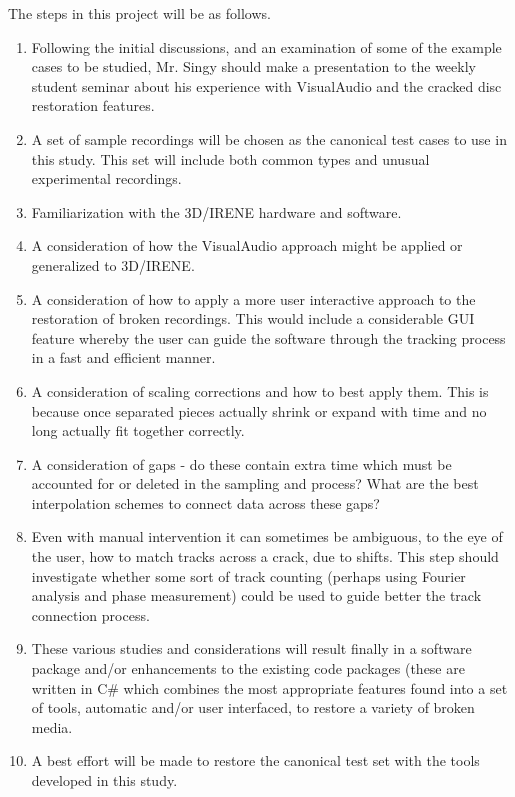 The steps in this project will be as follows.

\begin{enumerate}
\item Following the initial discussions, and an examination of some of the example cases to be studied, Mr. Singy should make a presentation to the weekly student seminar about his experience with VisualAudio and the cracked disc restoration features.
\item A set of sample recordings will be chosen as the canonical test cases to use in this study. This set will include both common types and unusual experimental recordings.
\item Familiarization with the 3D/IRENE hardware and software.
\item A consideration of how the VisualAudio approach might be applied or generalized to 3D/IRENE.
\item A consideration of how to apply a more user interactive approach to the restoration of broken recordings. This would include a considerable GUI feature whereby the user can guide the software through the tracking process in a fast and efficient manner.
\item A consideration of scaling corrections and how to best apply them. This is because once separated pieces actually shrink or expand with time and no long actually fit together correctly.
\item A consideration of gaps - do these contain extra time which must be accounted for or deleted in the sampling and process? What are the best interpolation schemes to connect data across these gaps?
\item Even with manual intervention it can sometimes be ambiguous, to the eye of the user, how to match tracks across a crack, due to shifts. This step should investigate whether some sort of track counting (perhaps using Fourier analysis and phase measurement) could be used to guide better the track connection process.
\item These various studies and considerations will result finally in a software package and/or enhancements to the existing code packages (these are written in C\# which combines the most appropriate features found into a set of tools, automatic and/or user interfaced, to restore a variety of broken media.
\item A best effort will be made to restore the canonical test set with the tools developed in this study.
\end{enumerate}